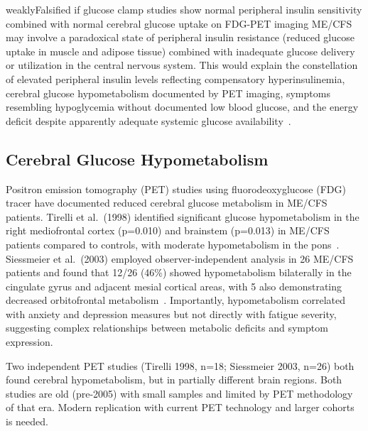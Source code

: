 \begin{fhypothesis}{weakly}{Falsified if glucose clamp studies show normal peripheral insulin sensitivity combined with normal cerebral glucose uptake on FDG-PET imaging}
\label{hyp:insulin-resistance}
ME/CFS may involve a paradoxical state of peripheral insulin resistance (reduced glucose uptake in muscle and adipose tissue) combined with inadequate glucose delivery or utilization in the central nervous system. This would explain the constellation of elevated peripheral insulin levels reflecting compensatory hyperinsulinemia, cerebral glucose hypometabolism documented by PET imaging, symptoms resembling hypoglycemia without documented low blood glucose, and the energy deficit despite apparently adequate systemic glucose availability~\cite{tirelli1998pet,siessmeier2003pet}.
\end{fhypothesis}

\subsection{Cerebral Glucose Hypometabolism}

\begin{achievement}
\label{ach:brain-hypometabolism}
Positron emission tomography (PET) studies using fluorodeoxyglucose (FDG) tracer have documented reduced cerebral glucose metabolism in ME/CFS patients. Tirelli et al.\ (1998) identified significant glucose hypometabolism in the right mediofrontal cortex (p=0.010) and brainstem (p=0.013) in ME/CFS patients compared to controls, with moderate hypometabolism in the pons~\cite{tirelli1998pet}. Siessmeier et al.\ (2003) employed observer-independent analysis in 26 ME/CFS patients and found that 12/26 (46\%) showed hypometabolism bilaterally in the cingulate gyrus and adjacent mesial cortical areas, with 5 also demonstrating decreased orbitofrontal metabolism~\cite{siessmeier2003pet}. Importantly, hypometabolism correlated with anxiety and depression measures but not directly with fatigue severity, suggesting complex relationships between metabolic deficits and symptom expression.
\end{achievement}

\begin{warning}
Two independent PET studies (Tirelli 1998, n=18; Siessmeier 2003, n=26) both found cerebral hypometabolism, but in partially different brain regions. Both studies are old (pre-2005) with small samples and limited by PET methodology of that era. Modern replication with current PET technology and larger cohorts is needed.
\end{warning}

